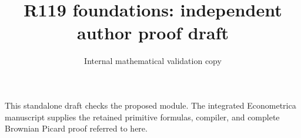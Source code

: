 \documentclass[11pt]{article}
\begin{document}
\title{R119 foundations: independent author proof draft}
\author{Internal mathematical validation copy}
\date{}
\maketitle
This standalone draft checks the proposed module. The integrated
Econometrica manuscript supplies the retained primitive formulas,
compiler, and complete Brownian Picard proof referred to here.




\end{document}
